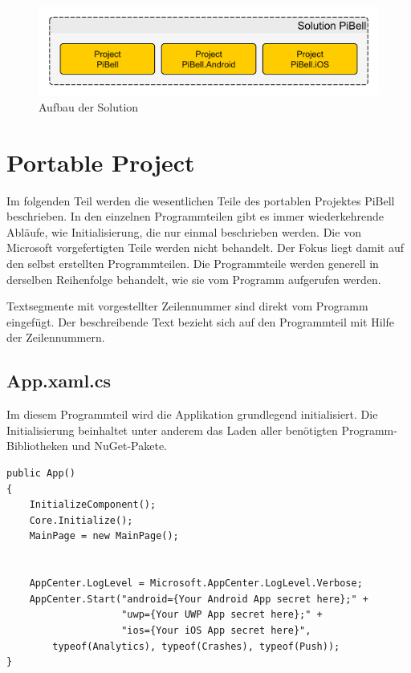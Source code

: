 \begin{figure}
\centering\includegraphics[width=0.9\linewidth]{images/xamarin/struktur.png}
\caption{Aufbau der Solution}
\label{fig:solution}
\end{figure}

%
\section{Portable Project}
Im folgenden Teil werden die wesentlichen Teile des portablen Projektes PiBell beschrieben.
In den einzelnen Programmteilen gibt es immer wiederkehrende Abläufe, wie Initialisierung, die nur einmal beschrieben werden.
Die von Microsoft vorgefertigten Teile werden nicht behandelt.
Der Fokus liegt damit auf den selbst erstellten Programmteilen.
Die Programmteile werden generell in derselben Reihenfolge behandelt, wie sie vom Programm aufgerufen werden.\par

Textsegmente mit vorgestellter Zeilennummer sind direkt vom Programm eingefügt.
Der beschreibende Text bezieht sich auf den Programmteil mit Hilfe der Zeilennummern.

\subsection{App.xaml.cs}
\label{ssec:app-xaml-cs}
Im diesem Programmteil wird die Applikation grundlegend initialisiert.
Die Initialisierung beinhaltet unter anderem das Laden aller benötigten Programm-Bibliotheken und NuGet-Pakete.
\begin{verbatim}
public App()
{
    InitializeComponent();
    Core.Initialize();
    MainPage = new MainPage();


    AppCenter.LogLevel = Microsoft.AppCenter.LogLevel.Verbose;
    AppCenter.Start("android={Your Android App secret here};" +
                    "uwp={Your UWP App secret here};" +
                    "ios={Your iOS App secret here}",
        typeof(Analytics), typeof(Crashes), typeof(Push));
}
\end{verbatim}
